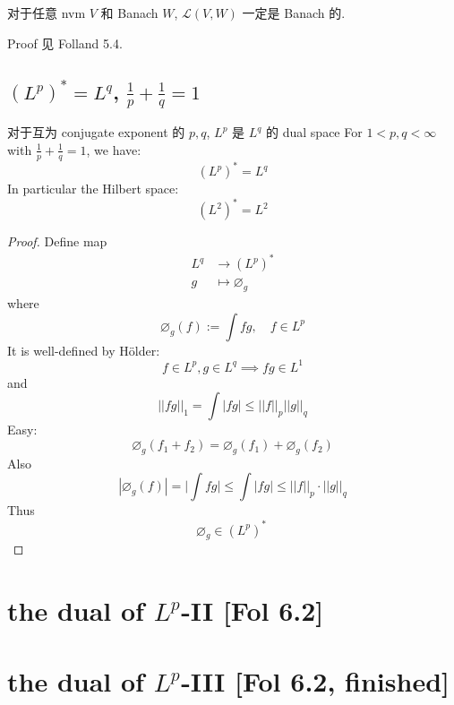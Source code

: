 \documentclass[lang=cn,11pt]{elegantbook}
\begin{document}
\begin{theorem}
对于任意 nvm $V$ 和 Banach $W$, \( \mathcal{L}(V,W)\) 一定是 Banach 的.
\end{theorem}
Proof 见 Folland 5.4.


\section{$(L^p)^* = L^q$, $\frac{1}{p} + \frac{1}{q} = 1$ }

\begin{theorem}{对于互为 conjugate exponent 的 $p,q$, $L^p$ 是 $L^q$ 的 dual space}
    For $1 < p,q < \infty$ with $\frac{1}{p} + \frac{1}{q} = 1$, we have: \[
(L^p)^* = L^q
\]
In particular the Hilbert space: \[
(L^2)^*  = L^2
\]

\end{theorem}

\begin{proof}
    Define map \begin{align}
        L^q &\to (L^p)^* \\
        g &\mapsto \varnothing_g
    \end{align}
    where $$\varnothing_g(f) := \int fg,\quad f \in L^p $$
    It is well-defined by Hölder: \[
    f\in L^p, g\in L^q \implies fg \in L^1 
    \]
    and \[
    ||fg||_1 = \int |fg| \leq  ||f||_p ||g||_q
    \]
    Easy: \[
    \varnothing_g (f_1 + f_2) = \varnothing_g (f_1) + \varnothing_g(f_2)
    \]
    Also \[
    |\varnothing_g(f)| =\bigg|\int fg\bigg| \leq \int |fg| \leq ||f||_p\cdot  ||g||_q
    \]
    Thus \[
    \varnothing_g \in (L^p)^*\
    \]
\end{proof}



\chapter{the dual of $L^p$-II [Fol 6.2]}












\chapter{the dual of $L^p$-III [Fol 6.2, finished]}
\end{document}
